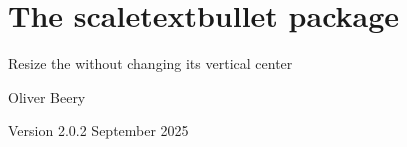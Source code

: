 \documentclass{article}
\begin{document}
\section*{The \textsf{scaletextbullet} package}

Resize the \texttt{\string\textbullet} without changing its vertical center

Oliver Beery

Version 2.0.2 September 2025

\end{document}
